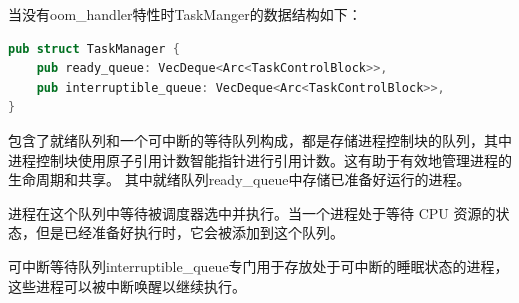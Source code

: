 当没有oom_handler特性时TaskManger的数据结构如下：
\begin{lstlisting}[language=rust]
    pub struct TaskManager {
    pub ready_queue: VecDeque<Arc<TaskControlBlock>>,
    pub interruptible_queue: VecDeque<Arc<TaskControlBlock>>,
}
\end{lstlisting}
包含了就绪队列和一个可中断的等待队列构成，都是存储进程控制块的队列，其中进程控制块使用原子引用计数智能指针进行引用计数。这有助于有效地管理进程的生命周期和共享。
其中就绪队列ready_queue中存储已准备好运行的进程。

进程在这个队列中等待被调度器选中并执行。当一个进程处于等待 CPU 资源的状态，但是已经准备好执行时，它会被添加到这个队列。

可中断等待队列interruptible_queue专门用于存放处于可中断的睡眠状态的进程，这些进程可以被中断唤醒以继续执行。

